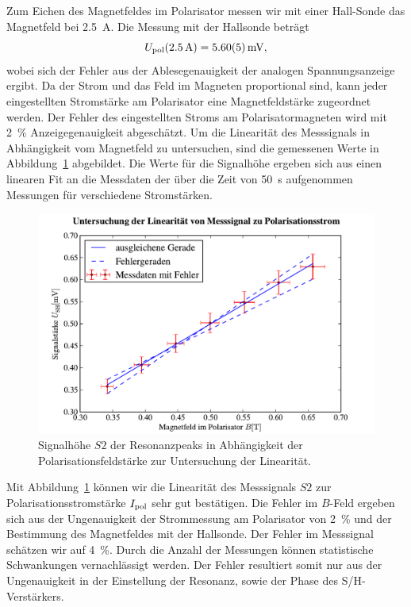 \documentclass[paper=a4,
	fontsize=10pt,
	DIV=18,
	twocolumn,
	parskip=half
	]{scrartcl}
\numberwithin{equation}{section}    %
\begin{document}
Zum Eichen des Magnetfeldes im Polarisator messen wir mit einer Hall-Sonde das Magnetfeld bei \SI{2.5}{\ampere}. Die Messung mit der Hallsonde beträgt
\begin{equation}
	U_{\rm pol}(\SI{2.5}{\ampere}) = \SI{5.60(5)}{\milli\volt},
\end{equation}
wobei sich der Fehler aus der Ablesegenauigkeit der analogen Spannungsanzeige ergibt. Da der Strom und das Feld im Magneten proportional sind, kann jeder eingestellten Stromstärke am Polarisator eine Magnetfeldstärke zugeordnet werden. Der Fehler des eingestellten Stroms am Polarisatormagneten wird mit \SI{2}{\percent} Anzeigegenauigkeit abgeschätzt.
Um die Linearität des Messsignals in Abhängigkeit vom Magnetfeld zu untersuchen, sind die gemessenen Werte in Abbildung~\ref{fig.polarisationsstrom} abgebildet. Die Werte für die Signalhöhe ergeben sich aus einen linearen Fit an die Messdaten der über die Zeit von \SI{50}{\second} aufgenommen Messungen für verschiedene Stromstärken.

\begin{figure}[htp]
	\begin{center}
		\includegraphics[width=\columnwidth]{Data-Plots/04-signal-polarisationsstrom.pdf}
		\caption{Signalhöhe $S2$ der Resonanzpeaks in Abhängigkeit der Polarisationsfeldstärke zur Untersuchung der Linearität.}
		\label{fig.polarisationsstrom}
	\end{center}
\end{figure}

Mit Abbildung~\ref{fig.polarisationsstrom} können wir die Linearität des Messsignals $S2$ zur Polarisationsstromstärke $I_{\rm pol}$ sehr gut bestätigen. Die Fehler im $B$-Feld ergeben sich aus der Ungenauigkeit der Strommessung am Polarisator von \SI{2}{\percent} und der Bestimmung des Magnetfeldes mit der Hallsonde. Der Fehler im Messsignal schätzen wir auf \SI{4}{\percent}. Durch die Anzahl der Messungen können statistische Schwankungen vernachlässigt werden. Der Fehler resultiert somit nur aus der Ungenauigkeit in der Einstellung der Resonanz, sowie der Phase des S/H-Verstärkers.
\end{document}
